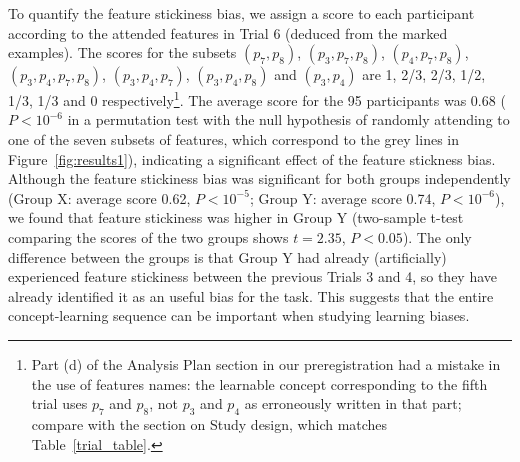 To quantify the feature stickiness bias, we assign a score to each participant according to the attended features in Trial 6 (deduced from the marked examples). The scores for the subsets $(p_7,p_8)$, $(p_3,p_7,p_8)$, $(p_4,p_7,p_8)$, $(p_3,p_4,p_7,p_8)$, $(p_3,p_4,p_7)$, $(p_3,p_4,p_8)$ and $(p_3,p_4)$ are 1, 2/3, 2/3, 1/2, 1/3, 1/3 and 0 respectively\footnote{Part (d) of the Analysis Plan section in our preregistration had a mistake in the use of features names: the learnable concept corresponding to the fifth trial uses $p_7$ and $p_8$, not $p_3$ and $p_4$ as erroneously written in that part; compare with the section on Study design, which matches Table~\ref{trial_table}.}. The average score for the 95 participants was 0.68 ($P<10^{-6}$ in a permutation test with the null hypothesis of randomly attending to one of the seven subsets of features, which correspond to the grey lines in Figure~\ref{fig:results1}), indicating a significant effect of the feature stickness bias. Although the feature stickiness bias was significant for both groups independently (Group X: average score 0.62, $P<10^{-5}$;  Group Y: average score 0.74, $P<10^{-6}$), we found that feature stickiness was higher in Group Y (two-sample t-test comparing the scores of the two groups shows $t=2.35$,  $P<0.05$). The only difference between the groups is that Group Y had already (artificially) experienced feature stickiness between the previous Trials 3 and 4, so they have already identified it as an useful bias for the task. This suggests that the entire concept-learning sequence can be important when studying learning biases. %

